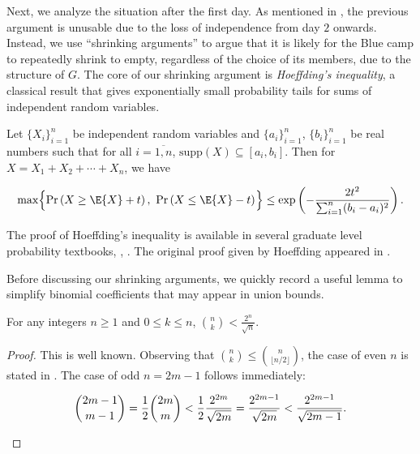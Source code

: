 \documentclass{toc}
\begin{document}
			\noindent Next, we analyze the situation after the first day.
			As mentioned in , the previous %
			argument  %
			is unusable due to the loss of independence from day $2$ onwards.
			Instead, we use ``shrinking arguments'' to argue that it is likely for the Blue camp to repeatedly shrink to empty, regardless of the choice of its members, due to %
			the structure of $G$.  %
			The core of our shrinking argument is \emph{Hoeffding's inequality}, a classical result that gives exponentially small probability tails for sums of independent random variables.
			\begin{theorem}  \label{thm:hoeffding}
				Let $\{X_i\}_{i=1}^n$ be independent random variables and $\{a_i\}_{i=1}^n$, $\{b_i\}_{i=1}^n$ be real numbers such that for all $i=\overline{1, n}$, $\text{supp}(X)\subseteq [a_i, b_i]$. Then for $X = X_1+X_2+\cdots + X_n$, we have
				\begin{linenomath}\begin{equation*}
						\max \Bigl\{\Pr\left( X \ge \E{X} + t \right),\ \Pr\left( X \le \E{X} -t \right)^{} \Bigr\} \le \exp\left(-\frac{2t^2}{\sum_{i=1}^n (b_i - a_i)^2}\right).
				\end{equation*}\end{linenomath}
			\end{theorem}
			The proof of Hoeffding's inequality is 
			available in %
			several  %
			graduate level probability textbooks, \eg, \cite{vershynin2018}. The original proof given by Hoeffding appeared in \cite{hoeffding1963}.
			
			Before discussing our shrinking arguments, we quickly record a useful
			lemma to simplify binomial coefficients that may appear in union bounds.
			\begin{lemma}  \label{lem:binom-bound}
				For any integers $n\ge 1$ and $0\le k\le n$, $\displaystyle \binom{n}{k} < \frac{2^n}{\sqrt{n}}$.
			\end{lemma}
			\begin{proof}
				This is well known.  Observing that $\binom{n}{k}\le \binom{n}{\lfloor n/2\rfloor}$,
				the case of even $n$ is stated in \cite[2.6.2 Proposition]{invitation}.  The case of
				odd $n=2m-1$ follows immediately:
				\begin{linenomath}\begin{equation*}
						\binom{2m - 1}{m - 1} = \frac{1}{2} \binom{2m}{m} < \frac{1}{2} \frac{2^{2m}}{\sqrt{2m}}
						= \frac{2^{2m - 1}}{\sqrt{2m}} < \frac{2^{2m - 1}}{\sqrt{2m - 1}}.  \qedhere
				\end{equation*}\end{linenomath}
			\end{proof}
			
\end{document}
